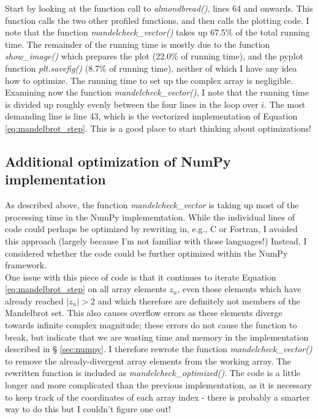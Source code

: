 \documentclass[paper=a4, fontsize=11pt]{scrartcl} %
\numberwithin{equation}{section} %
\numberwithin{figure}{section} %
\numberwithin{table}{section} %
\begin{document}
Start by looking at the function call to \emph{almondbread()}, lines 64 and onwards. This function calls the two other profiled functions, and then calls the plotting code. I note that the function \emph{mandelcheck\_vector()} takes up 67.5\% of the total running time. The remainder of the running time is mostly due to the function \emph{show\_image()} which prepares the plot (22.0\% of running time), and the pyplot function \emph{plt.savefig()} (8.7\% of running time), neither of which I have any idea how to optimize. The running time to set up the complex array is negligible.\\

Examining now the function \emph{mandelcheck\_vector()}, I note that the running time is divided up roughly evenly between the four lines in the loop over $i$. The most demanding line is line 43, which is the vectorized implementation of Equation \ref{eq:mandelbrot_step}. This is a good place to start thinking about optimizations!

\subsection{Additional optimization of NumPy implementation}\label{sec:numpy2}

As described above, the function \emph{mandelcheck\_vector} is taking up most of the processing time in the NumPy implememtation. While the individual lines of code could perhaps be optimized by rewriting in, e.g., C or Fortran, I avoided this approach (largely because I'm not familiar with those languages!) Instead, I considered whether the code could be further optimized within the NumPy framework.\\

One issue with this piece of code is that it continues to iterate Equation \ref{eq:mandelbrot_step} on all array elements $z_n$, even those elements which have already reached $|z_n|>2$ and which therefore are definitely not members of the Mandelbrot set. This also causes overflow errors as these elements diverge towards infinite complex magnitude; these errors do not cause the function to break, but indicate that we are wasting time and memory in the implementation described in § \ref{sec:numpy}. I therefore rewrote the function \emph{mandelcheck\_vector()} to remove the already-divergent array elements from the working array. The rewritten function is included as \emph{mandelcheck\_optimized()}. The code is a little longer and more complicated than the previous implementation, as it is necessary to keep track of the coordinates of each array index - there is probably a smarter way to do this but I couldn't figure one out!\\
\end{document}
